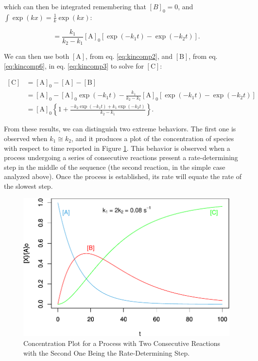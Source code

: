 \documentclass[
  9pt,
]{extbook}
\theoremstyle{definition}
\theoremstyle{definition}
\theoremstyle{definition}
\theoremstyle{definition}
\theoremstyle{remark}
\begin{document}
which can then be integrated remembering that \([B]_0=0\), and \(\int \exp(kx)=\frac{1}{k}\exp(kx)\):

\begin{equation}
[\mathrm{B}] = \frac{k_1}{k_2-k_1} [\mathrm{A}]_0 [\exp(-k_1t)-\exp(-k_2t)].
\label{eq:kincomp6}
\end{equation}

We can then use both \([\mathrm{A}]\), from eq. \eqref{eq:kincomp2}, and \([\mathrm{B}]\), from eq. \eqref{eq:kincomp6}, in eq. \eqref{eq:kincomp3} to solve for \([\mathrm{C}]\):

\begin{equation}
\begin{aligned}
\left[\mathrm{C}\right] &= [\mathrm{A}]_0-[\mathrm{A}]-[\mathrm{B}] \\
&= [\mathrm{A}]_0-[\mathrm{A}]_0 \exp(-k_1 t)-\frac{k_1}{k_2-k_1} [\mathrm{A}]_0 [\exp(-k_1t)-\exp(-k_2t)] \\
&= [\mathrm{A}]_0\left\{1+\frac{-k_2 \exp(-k_1t)+ k_1 \exp(-k_2t)}{k_2-k_1} \right\}.
\end{aligned}
\label{eq:kincomp7}
\end{equation}

From these results, we can distinguish two extreme behaviors. The first one is observed when \(k_1 \cong k_2\), and it produces a plot of the concentration of species with respect to time reported in Figure \ref{fig:figk5}. This behavior is observed when a process undergoing a series of consecutive reactions present a rate-determining step in the middle of the sequence (the second reaction, in the simple case analyzed above). Once the process is established, its rate will equate the rate of the slowest step.

\begin{figure}

{\centering \includegraphics{pchem1_files/figure-latex/figk5-1} 

}

\caption{Concentration Plot for a Process with Two Consecutive Reactions with the Second One Being the Rate-Determining Step.}\label{fig:figk5}
\end{figure}
\end{document}

